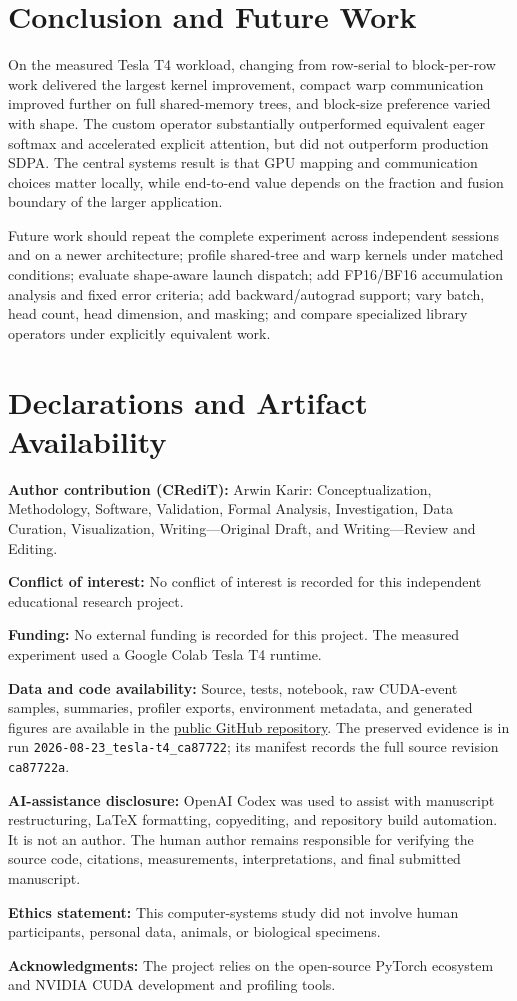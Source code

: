 \documentclass[twoside,twocolumn,10pt]{article}
\newcommand{\code}[1]{\texttt{#1}}
\begin{document}
\section{Conclusion and Future Work}

On the measured Tesla T4 workload, changing from row-serial to block-per-row
work delivered the largest kernel improvement, compact warp communication
improved further on full shared-memory trees, and block-size preference varied
with shape. The custom operator substantially outperformed equivalent eager
softmax and accelerated explicit attention, but did not outperform production
SDPA. The central systems result is that GPU mapping and communication choices
matter locally, while end-to-end value depends on the fraction and fusion
boundary of the larger application.

Future work should repeat the complete experiment across independent sessions
and on a newer architecture; profile shared-tree and warp kernels under matched
conditions; evaluate shape-aware launch dispatch; add FP16/BF16 accumulation
analysis and fixed error criteria; add backward/autograd support; vary batch,
head count, head dimension, and masking; and compare specialized library
operators under explicitly equivalent work.

\section{Declarations and Artifact Availability}

\textbf{Author contribution (CRediT):} Arwin Karir: Conceptualization,
Methodology, Software, Validation, Formal Analysis, Investigation, Data
Curation, Visualization, Writing---Original Draft, and Writing---Review and
Editing.

\textbf{Conflict of interest:} No conflict of interest is recorded for this
independent educational research project.

\textbf{Funding:} No external funding is recorded for this project. The
measured experiment used a Google Colab Tesla T4 runtime.

\textbf{Data and code availability:} Source, tests, notebook, raw CUDA-event
samples, summaries, profiler exports, environment metadata, and generated
figures are available in the
\href{https://github.com/Arwin-K/cuda-attention-softmax}{public GitHub repository}.
The preserved evidence is in run
\code{2026-08-23\_tesla-t4\_ca87722}; its manifest records the full source
revision \code{ca87722a}.

\textbf{AI-assistance disclosure:} OpenAI Codex was used to assist with
manuscript restructuring, LaTeX formatting, copyediting, and repository build
automation. It is not an author. The human author remains responsible for
verifying the source code, citations, measurements, interpretations, and final
submitted manuscript.

\textbf{Ethics statement:} This computer-systems study did not involve human
participants, personal data, animals, or biological specimens.

\textbf{Acknowledgments:} The project relies on the open-source PyTorch
ecosystem and NVIDIA CUDA development and profiling tools.

\balance
\printbibliography
\end{document}
